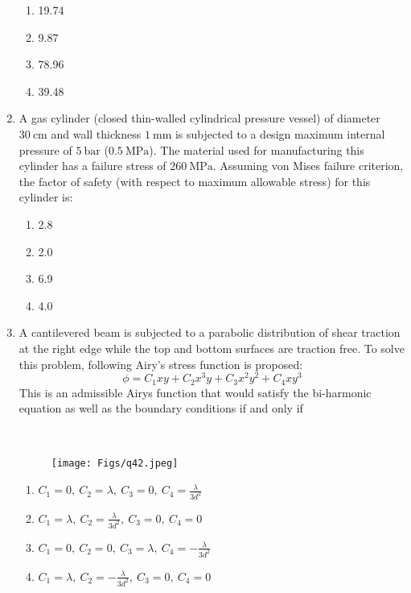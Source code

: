 \documentclass[journal]{IEEEtran}
\begin{document}
\begin{enumerate}
\begin{multicols}{2}
\begin{enumerate}
    \item 19.74
    \item 9.87
    \item 78.96
    \item 39.48
\end{enumerate}
\end{multicols}
\hfill{}

\item \quad A gas cylinder (closed thin-walled cylindrical pressure vessel) of diameter $30\ \mathrm{cm}$ and wall thickness $1\ \mathrm{mm}$ is subjected to a design maximum internal pressure of $5\ \mathrm{bar}$ ($0.5\ \mathrm{MPa}$). The material used for manufacturing this cylinder has a failure stress of $260\ \mathrm{MPa}$. Assuming von Mises failure criterion, the factor of safety (with respect to maximum allowable stress) for this cylinder is:

\begin{multicols}{2}
\begin{enumerate}
    \item 2.8
    \item 2.0
    \item 6.9
    \item 4.0
\end{enumerate}
\end{multicols}
\hfill{}

\item \quad A cantilevered beam is subjected to a parabolic distribution of shear traction at the right edge while the top and bottom surfaces are traction free. To solve this problem, following Airy's stress function is proposed:  
$$
\phi = C_1 xy + C_2 x^3 y + C_3 x^2 y^2 + C_4 x y^3
$$  
This is an admissible Airys function that would satisfy the bi-harmonic equation as well as the boundary conditions if and only if

\
\begin{figure}[H]
\centering
\texttt{[image: Figs/q42.jpeg]}
\caption{}
\end{figure}


\begin{multicols}{2}
\begin{enumerate}
    \item $C_1 = 0,\ C_2 = \lambda,\ C_3 = 0,\ C_4 = \frac{\lambda}{3d^2}$
    \item $C_1 = \lambda,\ C_2 = \frac{\lambda}{3d^2},\ C_3 = 0,\ C_4 = 0$
    \item $C_1 = 0,\ C_2 = 0,\ C_3 = \lambda,\ C_4 = -\frac{\lambda}{3d^2}$
    \item $C_1 = \lambda,\ C_2 = -\frac{\lambda}{3d^2},\ C_3 = 0,\ C_4 = 0$
\end{enumerate}
\end{multicols}
\hfill{}



\end{enumerate}
\end{document}
